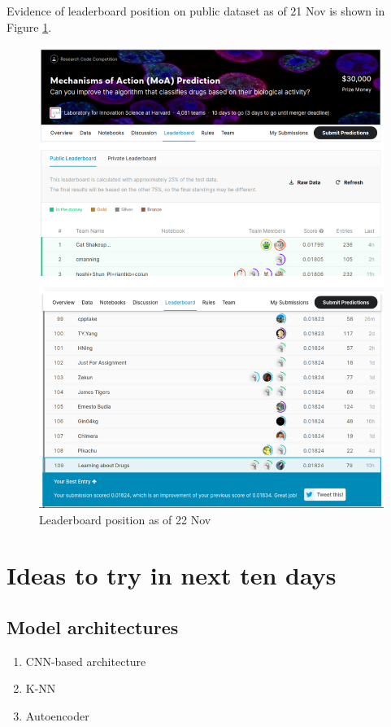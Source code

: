 \documentclass{article}
\begin{document}
Evidence of leaderboard position on public dataset as of 21 Nov is shown in Figure \ref{fig:lb22nov}.
\begin{figure}[H]
\begin{center}
	\includegraphics[width=1\textwidth]{pics/lb22nov.png}
    \caption{Leaderboard position as of 22 Nov}
\label{fig:lb22nov}
\end{center}
\end{figure}

\section{Ideas to try in next ten days}
\subsection{Model architectures}
\begin{enumerate}
    \item CNN-based architecture
    \item K-NN
    \item Autoencoder 
\end{enumerate}
\end{document}
